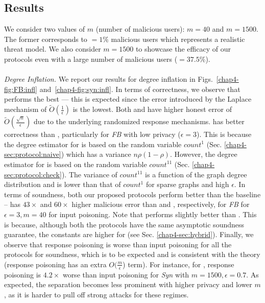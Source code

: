 \subsection{Results} \label{chap4-sec:exp-results}
 We consider two values of $m$ (number of malicious users): $m=40$ and $m=1500$. The former corresponds to $=1\%$ malicious users which represents a realistic threat model. We also consider $m=1500$ to showcase the efficacy of our protocols even with a large number of malicious users ($=37.5\%$).
\\\\\noindent\textit{Degree Inflation.} We report our results for degree inflation in Figs.~\ref{chap4-fig:FB:infl} and~\ref{chap4-fig:syn:infl}.  In terms of correctness, we observe that \DegHybrid{} performs the best --- this is expected since the error introduced by the Laplace mechanism of $\tilde{O}(\frac{1}{\epsilon})$ is the lowest. Both \DegRRCheck{} and \DegRRNaive{}  have higher honest error of $\tilde{O}(\frac{\sqrt{n}}{\epsilon})$ due to the underlying randomized response mechanisms. \DegRRCheck{} has better correctness than \DegRRNaive{}, particularly for \textit{FB} with low privacy ($\epsilon=3$). This is because the degree estimator for \DegRRNaive{} is based on the random variable $count^{1}$  (Sec. \ref{chap4-sec:protocol:naive}) which  has a variance $n\rho(1-\rho)$. However, the degree estimator for \DegRRCheck{} is based on the random variable $count^{11}$ (Sec. \ref{chap4-sec:protocol:check}). The variance of $count^{11}$ is a function of the graph degree distribution and is lower than that of $count^{1}$ for sparse graphs and high $\epsilon$. 
In terms of soundness, both our proposed protocols perform better than the baseline  -- \DegRRNaive{}  has $43\times$ and $60\times$ higher malicious error than \DegHybrid{} and \DegRRCheck, respectively, for \textit{FB} for $\epsilon=3, m=40$ for input poisoning. Note that \DegRRCheck{} performs slightly better than \DegHybrid. This is because, although both the protocols have the same asymptotic soundness guarantee, the constants are higher for \DegHybrid (see Sec. \ref{chap4-sec:hybrid}). %
Finally, we observe that response poisoning is worse than input poisoning for all the protocols for soundness, which is to be expected and is consistent with the theory (response poisoning has an extra $O(\frac{m}{\epsilon}$) term). For instance, for \DegRRCheck{}, response poisoning is $4.2\times$ worse than input poisoning for \textit{Syn} with $m=1500,\epsilon=0.7$. As expected, the separation becomes less prominent with higher privacy and lower $m$, as it is harder to pull off strong attacks for these regimes.



